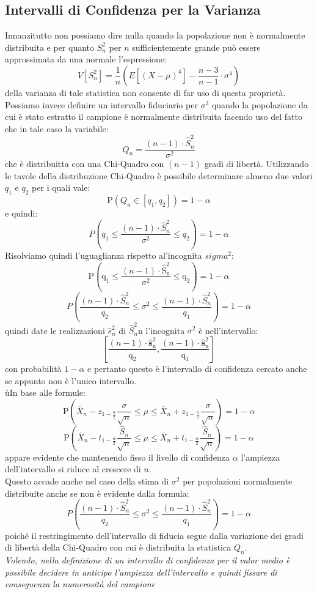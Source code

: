 \documentclass[a4paper,12pt, oneside]{book}
\begin{document}
\subsection{Intervalli di Confidenza per la Varianza}
Innanzitutto non possiamo dire nulla quando la popolazione non è normalmente
distribuita e per quanto $S_n^2$ per $n$ sufficientemente grande può essere approssimata da una normale
l'espressione:
\[V\left[S_{n}^{2}\right]=\frac{1}{n}\left(E\left[(X-\mu)^{4}\right]-\frac{n-3}{n-1} \cdot \sigma^{4}\right)\]
della varianza di tale statistica non consente di far uso di questa proprietà.
Possiamo invece definire un intervallo fiduciario per $\sigma^2$
quando la popolazione da cui è stato estratto il campione è normalmente distribuita facendo uso del fatto che in tale caso la variabile:
\[Q_{n}=\frac{(n-1) \cdot \hat{S}_{n}^{2}}{\sigma^{2}}\]
che è distribuitta con una Chi-Quadro con $(n-1)$ gradi di libertà.
Utilizzando le tavole della distribuzione Chi-Quadro è possibile determinare almeno
due valori $q_1$ e $q_2$ per i quali vale:
\[\mathrm{P}\left(Q_{n} \in\left[q_{1}, q_{2}\right]\right)=1-\alpha\]
e quindi:
\[P\left(q_{1} \leq \frac{(n-1) \cdot \hat{S}_{n}^{2}}{\sigma^{2}} \leq q_{2}\right)=1-\alpha\]
Risolviamo quindi l'uguaglianza rispetto al'incognita $sigma^2$:
\[\mathrm{P}\left(\mathrm{q}_{1} \leq \frac{(n-1) \cdot \hat{\mathrm{S}}_{\mathrm{n}}^{2}}{\sigma^{2}} \leq \mathrm{q}_{2}\right)=1-\alpha\]
\[P\left(\frac{(n-1) \cdot \hat{S}_{n}^{2}}{q_{2}} \leq \sigma^{2} \leq \frac{(n-1) \cdot \hat{S}_{n}^{2}}{q_{1}}\right)=1-\alpha\]
quindi date le realizzazioni $\hat{s}_n^2$ di  $\hat{S}_n^2$n l'incognita $\sigma^2$ è nell'intervallo:
\[\left[\frac{(n-1) \cdot \hat{\mathbf{s}}_{\mathrm{n}}^{2}}{\mathrm{q}_{2}}, \frac{(n-1) \cdot \hat{\mathbf{s}}_{\mathrm{n}}^{2}}{\mathrm{q}_{1}}\right]\]
con probabilità $1-\alpha$ e pertanto questo è l’intervallo di confidenza cercato anche se appunto non è l'unico intervallo.\\
ùIn base alle formule:
\[\mathrm{P}\left(\overline{X}_{n}-z_{1-\frac{\alpha}{2}} \frac{\sigma}{\sqrt{n}} \leq \mu \leq \overline{X}_{n}+z_{1-\frac{\alpha}{2}} \frac{\sigma}{\sqrt{n}}\right)=1-\alpha\]
\[\mathrm{P}\left(\overline{X}_{n}-t_{\mathrm{1}-\frac{\alpha}{2}} \frac{\hat{S}_{n}}{\sqrt{n}} \leq \mu \leq \overline{X}_{n}+t_{1-\frac{\alpha}{2}} \frac{\hat{S}_{n}}{\sqrt{n}}\right)=1-\alpha\]
appare evidente che mantenendo fisso il livello di confidenza $\alpha$ l'ampiezza
dell’intervallo si riduce al crescere di $n$.
\\Questo accade anche nel caso della stima di $\sigma^2$  per
popolazioni normalmente distribuite anche se non è evidente dalla formula:
\[P\left(\frac{(n-1) \cdot \hat{S}_{n}^{2}}{q_{2}} \leq \sigma^{2} \leq \frac{(n-1) \cdot \hat{S}_{n}^{2}}{q_{1}}\right)=1-\alpha\]
poiché il restringimento dell’intervallo di fiducia segue dalla variazione dei gradi di
libertà della Chi-Quadro con cui è distribuita la statistica $Q_n$.\\
\textit{Volendo, nella definizione di un intervallo di confidenza per il valor medio è
possibile decidere in anticipo l’ampiezza dell’intervallo e quindi fissare di
conseguenza la numerosità del campione}
\end{document}
